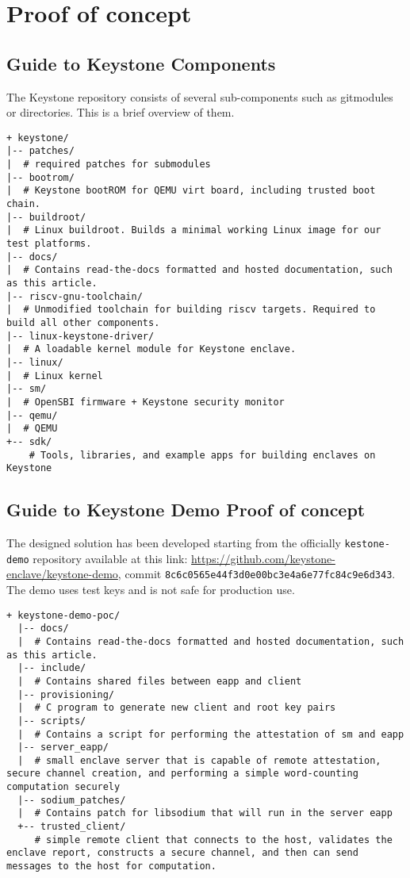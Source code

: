 
\section{Proof of concept}
\subsection{Guide to Keystone Components}
The Keystone repository consists of several sub-components such as gitmodules or directories. This is a brief overview of them.
\begin{lstlisting}[frame=single]
+ keystone/
|-- patches/
|  # required patches for submodules
|-- bootrom/
|  # Keystone bootROM for QEMU virt board, including trusted boot chain.
|-- buildroot/
|  # Linux buildroot. Builds a minimal working Linux image for our test platforms.
|-- docs/
|  # Contains read-the-docs formatted and hosted documentation, such as this article.
|-- riscv-gnu-toolchain/
|  # Unmodified toolchain for building riscv targets. Required to build all other components.
|-- linux-keystone-driver/
|  # A loadable kernel module for Keystone enclave.
|-- linux/
|  # Linux kernel
|-- sm/
|  # OpenSBI firmware + Keystone security monitor
|-- qemu/
|  # QEMU
+-- sdk/
    # Tools, libraries, and example apps for building enclaves on Keystone        
\end{lstlisting}

\subsection{Guide to Keystone Demo Proof of concept}
The designed solution has been developed starting from the officially \texttt{kestone-demo} repository available at this link: \url{https://github.com/keystone-enclave/keystone-demo}, commit \texttt{8c6c0565e44f3d0e00bc3e4a6e77fc84c9e6d343}. The demo uses test keys and is not safe for production use.
\begin{lstlisting}[frame=single]
  + keystone-demo-poc/
  |-- docs/
  |  # Contains read-the-docs formatted and hosted documentation, such as this article.
  |-- include/
  |  # Contains shared files between eapp and client
  |-- provisioning/
  |  # C program to generate new client and root key pairs
  |-- scripts/
  |  # Contains a script for performing the attestation of sm and eapp
  |-- server_eapp/
  |  # small enclave server that is capable of remote attestation, secure channel creation, and performing a simple word-counting computation securely
  |-- sodium_patches/
  |  # Contains patch for libsodium that will run in the server eapp
  +-- trusted_client/
     # simple remote client that connects to the host, validates the enclave report, constructs a secure channel, and then can send messages to the host for computation.       
  \end{lstlisting}

